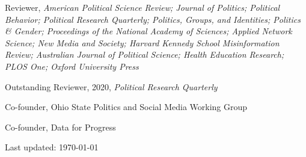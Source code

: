 \documentclass[letterpaper]{article}
\renewenvironment{itemize}{
  \begin{list}{}{
    \setlength{\leftmargin}{1.5em}
  }
}{
  \end{list}
}
\begin{document}
\begin{itemize}
\item Reviewer, \textit{American Political Science Review; Journal of Politics; Political Behavior; Political Research Quarterly; Politics, Groups, and Identities; Politics \& Gender; Proceedings of the National Academy of Sciences; Applied Network Science; New Media and Society; Harvard Kennedy School Misinformation Review; Australian Journal of Political Science; Health Education Research; PLOS One; Oxford University Press}
\begin{itemize}
Outstanding Reviewer, 2020, \textit{Political Research Quarterly}
\end{itemize}
\item Co-founder, Ohio State Politics and Social Media Working Group
\item Co-founder, Data for Progress
\end{itemize}

\begin{center}
  \begin{footnotesize}
    Last updated: \today
      \end{footnotesize}
\end{center}
\end{document}
